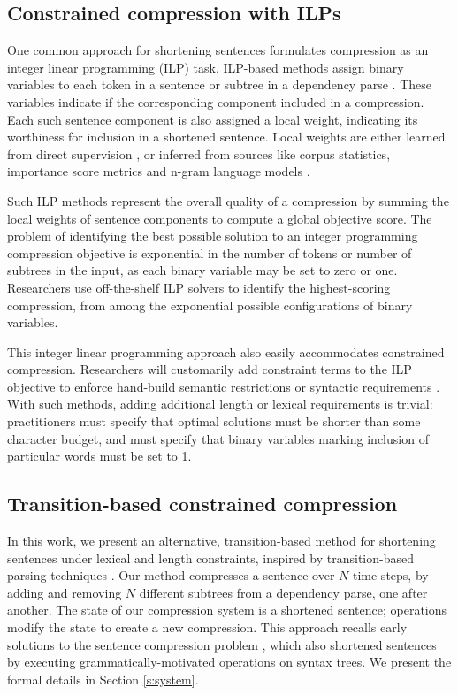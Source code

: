 \documentclass[11pt,a4paper]{article}
\begin{document}
\subsection{Constrained compression with ILPs}\label{s:ilps}

One common approach for shortening sentences formulates compression as an integer linear programming (ILP) task. ILP-based methods assign binary variables to each token in a sentence \cite{clarke2008global} or subtree in a dependency parse \cite{filippova2008dependency}. These variables indicate if the corresponding component included in a compression. Each such sentence component is also assigned a local weight, indicating its worthiness for inclusion in a shortened sentence. Local weights are either learned from direct supervision \cite{filippova2013overcoming,Wang2017CanSH}, or inferred from sources like corpus statistics, importance score metrics and n-gram language models \cite{clarke2008global,filippova2008dependency}.

Such ILP methods represent the overall quality of a compression by summing the local weights of sentence components to compute a global objective score.  The problem of identifying the best possible solution to an integer programming compression objective is exponential in the number of tokens or number of subtrees in the input, as each binary variable may be set to zero or one. Researchers use off-the-shelf ILP solvers to identify the highest-scoring compression, from among the exponential possible configurations of binary variables.

This integer linear programming approach also easily accommodates constrained compression. Researchers will customarily add constraint terms to the ILP objective to enforce hand-build semantic restrictions \cite{clarke2008global} or syntactic requirements \cite{filippova2008dependency}. With such methods, adding additional length or lexical requirements is trivial: practitioners must specify that optimal solutions must be shorter than some character budget, and must specify that binary variables marking inclusion of particular words must be set to 1. 

\subsection{Transition-based constrained compression}

In this work, we present an alternative, transition-based method for shortening sentences under lexical and length constraints, inspired by transition-based parsing techniques \cite{Earley1970AnEC,nivre2003}. Our method compresses a sentence over $N$ time steps, by adding and removing $N$ different subtrees from a dependency parse, one after another. The state of our compression system is a shortened sentence; operations modify the state to create a new compression. This approach recalls early solutions to the sentence compression problem \cite{Jing2000SentenceRF,Knight2000StatisticsBasedS}, which also shortened sentences by executing grammatically-motivated operations on syntax trees. We present the formal details in Section \ref{s:system}. 
\end{document}
